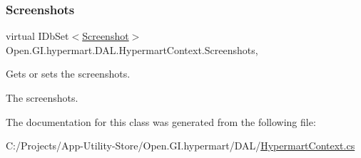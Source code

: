 \subsubsection{\texorpdfstring{Screenshots}{Screenshots}}
{\footnotesize\ttfamily virtual I\+Db\+Set$<$\hyperlink{class_open_1_1_g_i_1_1hypermart_1_1_models_1_1_screenshot}{Screenshot}$>$ Open.\+G\+I.\+hypermart.\+D\+A\+L.\+Hypermart\+Context.\+Screenshots\hspace{0.3cm}{\ttfamily [get]}, {\ttfamily [set]}}



Gets or sets the screenshots. 

The screenshots. 

The documentation for this class was generated from the following file\+:\begin{DoxyCompactItemize}
\item 
C\+:/\+Projects/\+App-\/\+Utility-\/\+Store/\+Open.\+G\+I.\+hypermart/\+D\+A\+L/\hyperlink{_hypermart_context_8cs}{Hypermart\+Context.\+cs}\end{DoxyCompactItemize}
